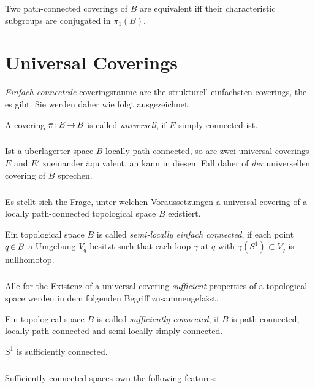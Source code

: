 \documentclass[11pt,twoside]{article}
\def\E{E}
\def\B{B}
\begin{document}
\begin{theorem1}
Two path-connected coverings of $\B$ are equivalent
iff
their characteristic subgroups are conjugated in $\pi_1(\B)$.
\end{theorem1}

\section{Universal Coverings}
\textit{Einfach connectede} coveringsr\"aume are the strukturell
einfachsten coverings, the es gibt.
Sie werden daher wie folgt ausgezeichnet:

\begin{definition} %
A covering $\pi \:\E \xto \B$ is called \textit{universell},
if $\E$ simply connected ist.
\end{definition}

\subparagraph{}
Ist a \"uberlagerter space $\B$ locally path-connected,
so are zwei universal coverings $\E$ and $\E'$ zueinander \"aquivalent.
an kann in diesem Fall daher of \textit{der} universellen covering of $\B$
sprechen.

\subparagraph{}
Es stellt sich the Frage,
unter welchen Voraussetzungen a universal covering of a locally
path-connected topological space $\B$ existiert.

\begin{definition}
Ein topological space $\B$ is called \textit{semi-locally einfach
connected},
if each point $q \xeof \B$ a Umgebung $V_q$ besitzt
such that
each loop $\gamma$ at $q$ with $\gamma(S^1) \subset V_q$ is nullhomotop.
\end{definition}

\subparagraph{}
Alle for the Existenz of a universal covering \textit{sufficient}
properties of a topological space werden in dem
folgenden Begriff zusammengefa\"sst.

\begin{definition}
Ein topological space $\B$ is called \textit{sufficiently connected},
if $\B$ is path-connected, locally path-connected
and semi-locally simply connected.
\end{definition}

\begin{example}
$S^1$ is sufficiently connected.
\end{example}

\subparagraph{}
Sufficiently connected spaces own the following features:
\end{document}
